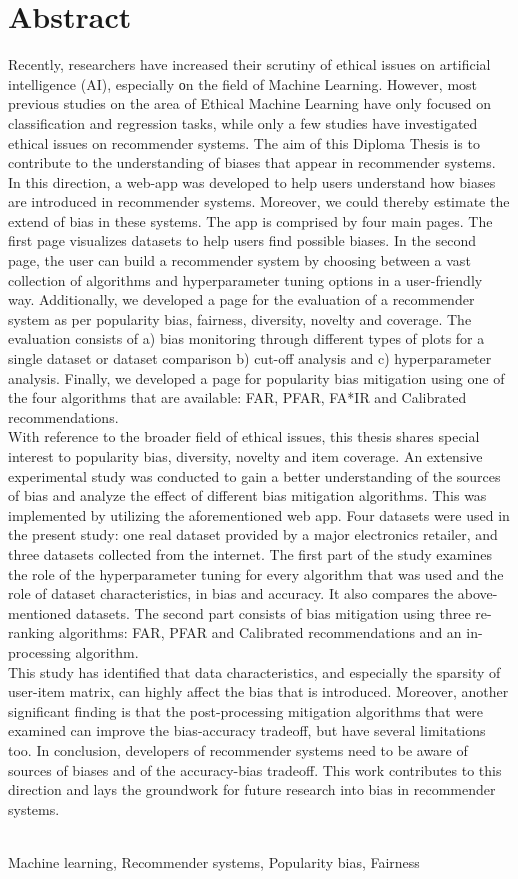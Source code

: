 \chapter{Abstract}
\label{abstract_en}
\noindent Recently, researchers have increased their scrutiny of ethical issues on artificial intelligence (AI), especially οn the field of Machine Learning. However, most previous studies on the area of Ethical Machine Learning have only focused on classification and regression tasks,  while only a few studies have investigated ethical issues on recommender systems.
The aim of this Diploma Thesis is to contribute to the understanding of biases that appear in recommender systems. \\
In this direction, a web-app was developed to help users understand how biases are introduced in recommender systems. Moreover, we could thereby estimate the extend of bias in these systems. The app is comprised by four main pages. The first page visualizes datasets to help users find possible biases. In the second page, the user can build a recommender system by choosing between a vast collection of algorithms and hyperparameter tuning options in a user-friendly way. Additionally, we developed a page for the evaluation of a recommender system as per popularity bias, fairness, diversity, novelty and coverage. The evaluation consists of a) bias monitoring through different types of plots for a single dataset or dataset comparison b) cut-off analysis and c) hyperparameter analysis. Finally, we developed a page for popularity bias mitigation using one of the four algorithms that are available:  FAR, PFAR, FA*IR and Calibrated recommendations.\\
With reference to the broader field of ethical issues, this thesis shares special interest to popularity bias, diversity, novelty and item coverage. An extensive experimental study was conducted to gain a better understanding of the sources of bias and analyze the effect of different bias mitigation algorith\-ms. This was implemented by utilizing the aforementioned web app. Four datasets were used in the present study: one real dataset provided by a major electronics retailer, and three datasets collected from the internet.
The first part of the study examines the role of the hyperparameter tuning for every algorithm that was used and the role of dataset characteristics, in bias and accuracy. It also compares the above-mentioned datasets. The second part consists of bias mitigation using three re-ranking algorithms: FAR, PFAR and Calibrated recommendations and an in-processing algorithm.\\
This study has identified that data characteristics, and especially the sparsity of user-item matrix, can highly affect the bias that is introduced. Moreover, another significant finding is that the post-processing mitigation algorithms that were examined can improve the bias-accuracy tradeoff, but have several limitations too.
In conclusion, developers of recommender systems need to be aware of sources of biases and of the accuracy-bias tradeoff. This work contributes to this direction and
lays the groundwork for future research into bias in recommender systems.

\vspace*{5mm}
\\
Machine learning, Recommender systems, Popularity bias, Fairness